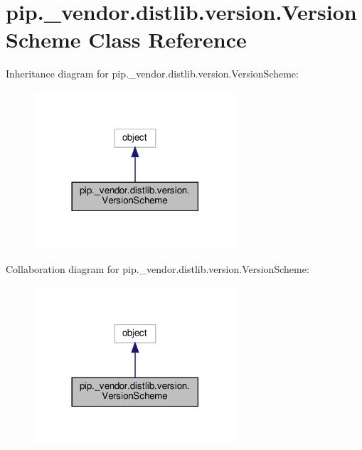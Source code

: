 \hypertarget{classpip_1_1__vendor_1_1distlib_1_1version_1_1VersionScheme}{}\section{pip.\+\_\+vendor.\+distlib.\+version.\+Version\+Scheme Class Reference}
\label{classpip_1_1__vendor_1_1distlib_1_1version_1_1VersionScheme}


Inheritance diagram for pip.\+\_\+vendor.\+distlib.\+version.\+Version\+Scheme\+:
\nopagebreak
\begin{figure}[H]
\begin{center}
\leavevmode
\includegraphics[width=213pt]{classpip_1_1__vendor_1_1distlib_1_1version_1_1VersionScheme__inherit__graph}
\end{center}
\end{figure}


Collaboration diagram for pip.\+\_\+vendor.\+distlib.\+version.\+Version\+Scheme\+:
\nopagebreak
\begin{figure}[H]
\begin{center}
\leavevmode
\includegraphics[width=213pt]{classpip_1_1__vendor_1_1distlib_1_1version_1_1VersionScheme__coll__graph}
\end{center}
\end{figure}
